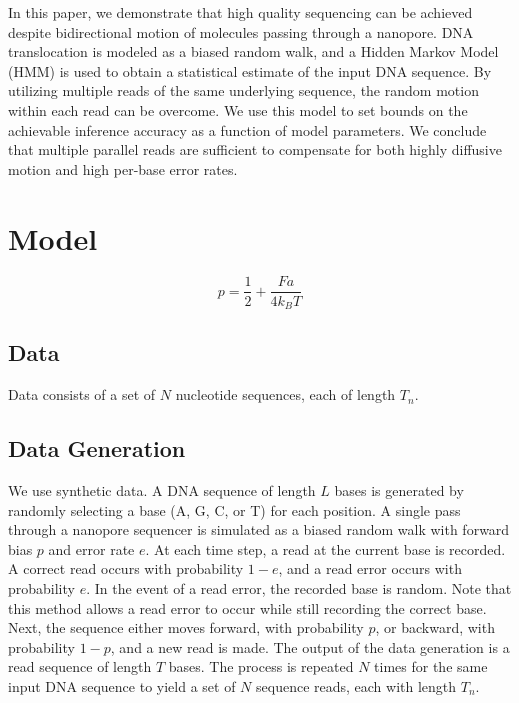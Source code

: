 \documentclass[12pt]{article}
\begin{document}
In this paper, we demonstrate that high quality sequencing can be achieved despite bidirectional motion of molecules passing through a nanopore.
DNA translocation is modeled as a biased random walk, and a Hidden Markov Model (HMM) is used to obtain a statistical estimate of the input DNA sequence.
By utilizing multiple reads of the same underlying sequence, the random motion within each read can be overcome.
We use this model to set bounds on the achievable inference accuracy as a function of model parameters.
We conclude that multiple parallel reads are sufficient to compensate for both highly diffusive motion and high per-base error rates.


\section{Model}

\begin{equation}
    p = \frac{1}{2} + \frac{Fa}{4k_{B}T}
\end{equation}
\subsection{Data}
Data consists of a set of $N$ nucleotide sequences, each of length $T_n$.


\subsection{Data Generation}
We use synthetic data.
A DNA sequence of length $L$ bases is generated by randomly selecting a base (A, G, C, or T) for each position.
A single pass through a nanopore sequencer is simulated as a biased random walk with forward bias $p$ and error rate $e$.
At each time step, a read at the current base is recorded.
A correct read occurs with probability $1-e$, and a read error occurs with probability $e$.
In the event of a read error, the recorded base is random.
Note that this method allows a read error to occur while still recording the correct base.
Next, the sequence either moves forward, with probability $p$, or backward, with probability $1-p$, and a new read is made.
The output of the data generation is a read sequence of length $T$ bases.
The process is repeated $N$ times for the same input DNA sequence to yield a set of $N$ sequence reads, each with length $T_n$.
\end{document}
